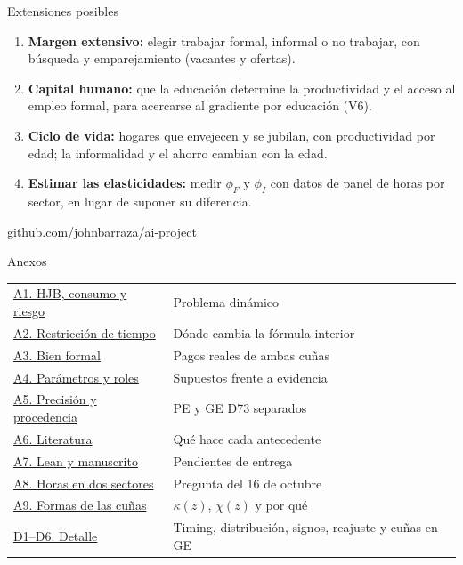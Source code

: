 \documentclass[aspectratio=169,11pt]{beamer}
\newcommand{\back}[1]{\hfill\hyperlink{#1}{\beamerreturnbutton{Volver}}}
\begin{document}
\begin{frame}[label=critica]{Extensiones posibles}
\begin{enumerate}
\item \textbf{Margen extensivo:} elegir trabajar formal, informal o no trabajar, con búsqueda y emparejamiento (vacantes y ofertas).
\vspace{4mm}
\item \textbf{Capital humano:} que la educación determine la productividad y el acceso al empleo formal, para acercarse al gradiente por educación (V6).
\vspace{4mm}
\item \textbf{Ciclo de vida:} hogares que envejecen y se jubilan, con productividad por edad; la informalidad y el ahorro cambian con la edad.
\vspace{4mm}
\item \textbf{Estimar las elasticidades:} medir $\phi_F$ y $\phi_I$ con datos de panel de horas por sector, en lugar de suponer su diferencia.
\end{enumerate}
\vspace{4mm}

\vfill
\href{https://github.com/johnbarraza/ai-project}{github.com/johnbarraza/ai-project}\hfill\hyperlink{anexos}{}
\end{frame}

\appendix
\begin{frame}[plain]\vfill{}\vfill\end{frame}

\begin{frame}[label=anexos]{Anexos}
\begin{tabular}{@{}ll@{}}
\hyperlink{hjb}{A1. HJB, consumo y riesgo}&Problema dinámico\\[3mm]
\hyperlink{kkt}{A2. Restricción de tiempo}&Dónde cambia la fórmula interior\\[3mm]
\hyperlink{recursos}{A3. Bien formal}&Pagos reales de ambas cuñas\\[3mm]
\hyperlink{parametros}{A4. Parámetros y roles}&Supuestos frente a evidencia\\[3mm]
\hyperlink{precision}{A5. Precisión y procedencia}&PE y GE D73 separados\\[3mm]
\hyperlink{literatura}{A6. Literatura}&Qué hace cada antecedente\\[3mm]
\hyperlink{formalizacion}{A7. Lean y manuscrito}&Pendientes de entrega\\[3mm]
\hyperlink{reparto}{A8. Horas en dos sectores}&Pregunta del 16 de octubre\\[3mm]
\hyperlink{cunas}{A9. Formas de las cuñas}&$\kappa(z)$, $\chi(z)$ y por qué\\[3mm]
\hyperlink{det1}{D1--D6. Detalle}&Timing, distribución, signos, reajuste y cuñas en GE\\
\end{tabular}\back{critica}
\end{frame}
\end{document}
